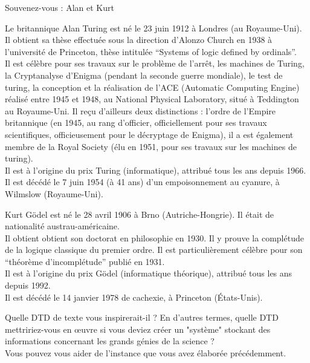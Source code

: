 \begin{frame}{Souvenez-vous : Alan et Kurt}
\begin{footnotesize}
Le britannique Alan Turing est n\'e le  23 juin 1912 \`a Londres (au Royaume-Uni). 
 Il obtient sa th\`ese effectu\'ee sous la direction d'Alonzo Church en 1938 \`a l'universit\'e de Princeton, th\`ese intitul\'ee ``Systems of logic defined by ordinals''. \\
 Il est c\'el\`ebre pour ses travaux sur le probl\`eme de l'arr\^et, les machines de Turing, la Cryptanalyse d'Enigma (pendant la seconde guerre mondiale), le test de turing, la conception et la r\'ealisation de l'ACE (Automatic Computing Engine) r\'ealis\'e entre 1945 et 1948, au National Physical Laboratory, situ\'e \`a Teddington au Royaume-Uni. Il re\c{c}u d'ailleurs deux distinctions : l'ordre de l'Empire britannique (en 1945, au rang d'officier, officiellement pour ses travaux scientifiques, officieusement pour le d\'ecryptage de Enigma), il a est \'egalement membre de la Royal Society (\'elu en 1951, pour ses travaux sur les machines de turing).\\
 Il est \`a l'origine du prix Turing (informatique), attribu\'e tous les ans depuis 1966.\\
 Il est d\'ec\'ed\'e le 7 juin 1954 (\`a 41 ans) d'un empoisonnement au cyanure, \`a Wilmslow (Royaume-Uni).

\smallskip

 Kurt G\"odel est n\'e le 28 avril 1906 \`a Brno (Autriche-Hongrie). Il \'etait de nationalit\'e austrau-am\'ericaine.\\
 Il obtient obtient son doctorat en philosophie en 1930. Il y prouve la compl\'etude de la logique classique du premier ordre. Il est particuli\`erement c\'el\`ebre pour son ``th\'eor\`eme d'incompl\'etude'' publi\'e en 1931.\\
 Il est \`a l'origine du prix G\"odel (informatique th\'eorique), attribu\'e tous les ans depuis 1992.\\
 Il est d\'ec\'ed\'e le 14 janvier 1978 de cachexie, \`a Princeton (\'Etats-Unis).\\
\end{footnotesize}

\begin{exoblock}
Quelle DTD de texte vous inspirerait-il ? En d'autres termes, quelle DTD mettririez-vous en œuvre si vous deviez créer un "système" stockant des informations concernant les grands génies de la science ?\\
Vous pouvez vous aider de l'instance que vous avez élaborée précédemment.
\end{exoblock}
\end{frame}


